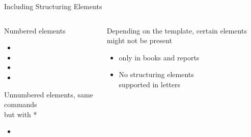 \begin{frame}[fragile]{Including Structuring Elements}
\vspace{.5cm}
	\begin{columns}[t]
		\begin{column}{.5\textwidth}
			Numbered elements
			\begin{itemize}
				\item {}
				\item {}
				\item {}
				\item {}
			\end{itemize}
			Unnumbered elements, same commands \\but with *
			\begin{itemize}
				\item {}
			\end{itemize}
		\end{column}
		\begin{column}{.5\textwidth}
			Depending on the template, certain elements might not be present
			\begin{itemize}
				\item {} only in books and reports
				\item No structuring elements\\ supported in letters
			\end{itemize}
		\end{column}
	\end{columns}	
\end{frame}

